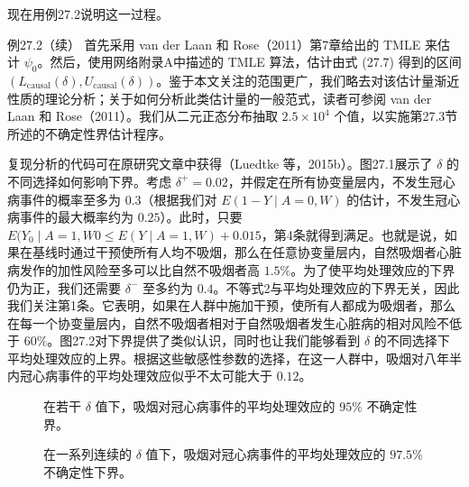 现在用例27.2说明这一过程。

\begin{bookresult}{例}{27.2（续）}
首先采用 van der Laan 和 Rose（2011）第7章给出的 TMLE 来估计 $\psi_0$。然后，使用网络附录A中描述的 TMLE 算法，估计由式 (27.7) 得到的区间 $(L_{\mathrm{causal}}(\delta),U_{\mathrm{causal}}(\delta))$。鉴于本文关注的范围更广，我们略去对该估计量渐近性质的理论分析；关于如何分析此类估计量的一般范式，读者可参阅 van der Laan 和 Rose（2011）。我们从二元正态分布抽取 $2.5\times10^4$ 个值，以实施第27.3节所述的不确定性界估计程序。

复现分析的代码可在原研究文章中获得（Luedtke 等，2015b）。图27.1展示了 $\delta$ 的不同选择如何影响下界。考虑 $\delta^+=0.02$，并假定在所有协变量层内，不发生冠心病事件的概率至多为 $0.3$（根据我们对 $E(1-Y\mid A=0,W)$ 的估计，不发生冠心病事件的最大概率约为 $0.25$）。此时，只要 $E(Y_0\mid A=1,W0\leq E(Y\mid A=1,W)+0.015$，第4条就得到满足。也就是说，如果在基线时通过干预使所有人均不吸烟，那么在任意协变量层内，自然吸烟者心脏病发作的加性风险至多可以比自然不吸烟者高 $1.5\%$。为了使平均处理效应的下界仍为正，我们还需要 $\delta^-$ 至多约为 $0.4$。不等式2与平均处理效应的下界无关，因此我们关注第1条。它表明，如果在人群中施加干预，使所有人都成为吸烟者，那么在每一个协变量层内，自然不吸烟者相对于自然吸烟者发生心脏病的相对风险不低于 $60\%$。图27.2对下界提供了类似认识，同时也让我们能够看到 $\delta$ 的不同选择下平均处理效应的上界。根据这些敏感性参数的选择，在这一人群中，吸烟对八年半内冠心病事件的平均处理效应似乎不太可能大于 $0.12$。

\begin{figure}[htbp]
 \centering
 
 \caption{在若干 $\delta$ 值下，吸烟对冠心病事件的平均处理效应的 $95\%$ 不确定性界。}
 \label{fig:ch27-sensitivity-heatmap}
\end{figure}

\begin{figure}[htbp]
 \centering
 
 \caption{在一系列连续的 $\delta$ 值下，吸烟对冠心病事件的平均处理效应的 $97.5\%$ 不确定性下界。}
 \label{fig:ch27-uncertainty-curves}
\end{figure}
\end{bookresult}
\FloatBarrier
